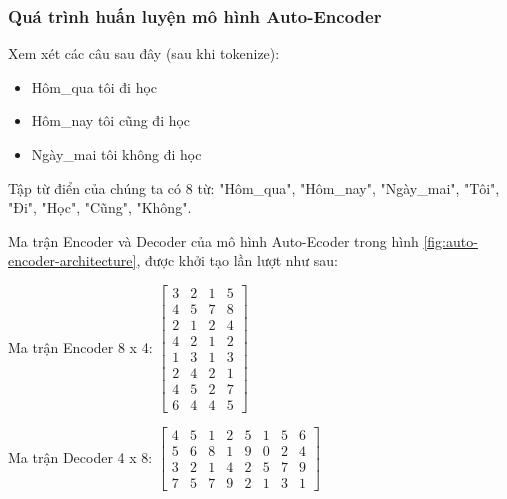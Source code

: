 \subsubsection{Quá trình huấn luyện mô hình Auto-Encoder}
Xem xét các câu sau đây (sau khi tokenize):
\begin{itemize}
    \item Hôm\_qua tôi đi học
    \item Hôm\_nay tôi cũng đi học
    \item Ngày\_mai tôi không đi học
\end{itemize}

Tập từ điển của chúng ta có 8 từ: "Hôm\_qua", "Hôm\_nay", "Ngày\_mai", "Tôi", "Đi", "Học", "Cũng", "Không".

Ma trận Encoder và Decoder của mô hình Auto-Ecoder trong hình \ref{fig:auto-encoder-architecture}, được khởi tạo lần lượt như sau:

Ma trận Encoder 8 x 4:
$\begin{bmatrix}
 3 & 2 & 1 & 5 \\
 4 & 5 & 7 & 8 \\
 2 & 1 & 2 & 4 \\
 4 & 2 & 1 & 2 \\
 1 & 3 & 1 & 3 \\
 2 & 4 & 2 & 1 \\
 4 & 5 & 2 & 7 \\
 6 & 4 & 4 & 5
\end{bmatrix}$

Ma trận Decoder 4 x 8:
$\begin{bmatrix}
 4 & 5 & 1 & 2 & 5 & 1 & 5 & 6 \\
 5 & 6 & 8 & 1 & 9 & 0 & 2 & 4 \\
 3 & 2 & 1 & 4 & 2 & 5 & 7 & 9 \\
 7 & 5 & 7 & 9 & 2 & 1 & 3 & 1
\end{bmatrix}$


